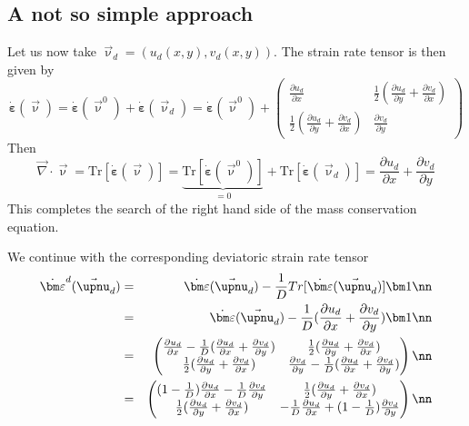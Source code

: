 \newpage
\subsection*{A not so simple approach}

Let us now take $\vec{\upnu}_d=(u_d(x,y) , v_d(x,y))$.
The strain rate tensor is then given by 
\[
\dot{\bm \varepsilon}(\vec\upnu)
= \dot{\bm \varepsilon}(\vec\upnu^0) + \dot{\bm \varepsilon}(\vec\upnu_d)
= \dot{\bm \varepsilon}(\vec\upnu^0) 
+ 
\begin{pmatrix}
\frac{\partial u_d}{\partial x} & \frac12 (\frac{\partial u_d}{\partial y}+ \frac{\partial v_d}{\partial x})  \\
\frac12 (\frac{\partial u_d}{\partial y}+ \frac{\partial v_d}{\partial x})  & \frac{\partial v_d}{\partial y}
\end{pmatrix}
\]
Then 
\[
\vec\nabla \cdot \vec\upnu 
= \text{Tr}[\dot{\bm \varepsilon}(\vec\upnu)]
= \underbrace{\text{Tr}[\dot{\bm \varepsilon}(\vec\upnu^0)]}_{=0}
+ \text{Tr}[\dot{\bm \varepsilon}(\vec\upnu_d)]
= \frac{\partial u_d}{\partial x} + \frac{\partial v_d}{\partial y}
\]
This completes the search of the right hand side of the mass conservation equation.

We continue with the corresponding deviatoric strain rate tensor 
\begin{eqnarray}
\dot{\bm \varepsilon}^d(\vec\upnu_d)
&=&\dot{\bm \varepsilon}(\vec\upnu_d) - \frac{1}{D} Tr[\dot{\bm \varepsilon}(\vec\upnu_d)] {\bm 1} \nn\\
&=&\dot{\bm \varepsilon}(\vec\upnu_d) - \frac{1}{D} (\frac{\partial u_d}{\partial x} + \frac{\partial v_d}{\partial y}) {\bm 1} \nn\\
&=&
\begin{pmatrix}
\frac{\partial u_d}{\partial x}- \frac{1}{D} (\frac{\partial u_d}{\partial x} + \frac{\partial v_d}{\partial y})
& \frac12 (\frac{\partial u_d}{\partial y}+ \frac{\partial v_d}{\partial x})  \\
\frac12 (\frac{\partial u_d}{\partial y}+ \frac{\partial v_d}{\partial x})  
& \frac{\partial v_d}{\partial y} - \frac{1}{D} (\frac{\partial u_d}{\partial x} + \frac{\partial v_d}{\partial y})
\end{pmatrix} \nn\\
&=& 
\begin{pmatrix}
(1-\frac{1}{D}) \frac{\partial u_d}{\partial x}- \frac{1}{D} \frac{\partial v_d}{\partial y}
& \frac12 (\frac{\partial u_d}{\partial y}+ \frac{\partial v_d}{\partial x})  \\
\frac12 (\frac{\partial u_d}{\partial y}+ \frac{\partial v_d}{\partial x})  
& -\frac{1}{D} \frac{\partial u_d}{\partial x} + (1- \frac{1}{D})  \frac{\partial v_d}{\partial y} 
\end{pmatrix} \nn
\end{eqnarray}

